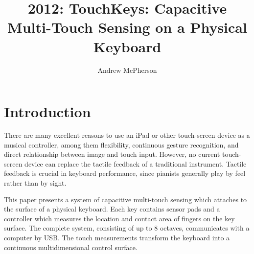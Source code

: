 
\graphicspath{ {mainmatter/McPherson_2012/} }

\title*{2012: TouchKeys: Capacitive Multi-Touch Sensing on a Physical Keyboard}

\author{Andrew McPherson}

%
%
\maketitle


\section{Introduction}
There are many excellent reasons to use an iPad or other touch-screen device as a musical controller, among them flexibility, continuous gesture recognition, and direct relationship between image and touch input. However, no current touch-screen device can replace the tactile feedback of a traditional instrument. Tactile feedback is crucial in keyboard performance, since pianists generally play by feel rather than by sight.

This paper presents a system of capacitive multi-touch sensing which attaches to the surface of a physical keyboard. Each key contains sensor pads and a controller which measures the location and contact area of fingers on the key surface. The complete system, consisting of up to 8 octaves, communicates with a computer by USB. The touch measurements transform the keyboard into a continuous multidimensional control surface.

